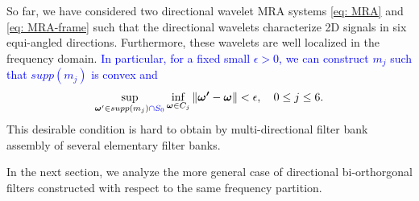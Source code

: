 

So far, we have considered two directional wavelet MRA systems \eqref{eq: MRA} and \eqref{eq: MRA-frame} such that the directional wavelets characterize 2D signals in six equi-angled directions. 
Furthermore, these wavelets are well localized in the frequency domain. \textcolor{blue}{In particular, for a fixed small $\epsilon>0$, we can construct $m_j$ such that  $supp(m_j)$ is convex and}%
\begin{align}\label{eq: no-alians}
 \sup_{\boldsymbol{\omega}'\in supp(m_j)\textcolor{blue}{\cap S_0} }\inf_{\boldsymbol{\omega}\in C_j}\Vert\boldsymbol{\omega'} - \boldsymbol{\omega}\Vert < \epsilon,\quad  0\leq j\leq 6.
\end{align}
This desirable condition is hard to obtain by multi-directional filter bank assembly of several elementary filter banks.

In the next section, we analyze the more general case of directional bi-orthorgonal filters constructed with respect to the same frequency partition. 